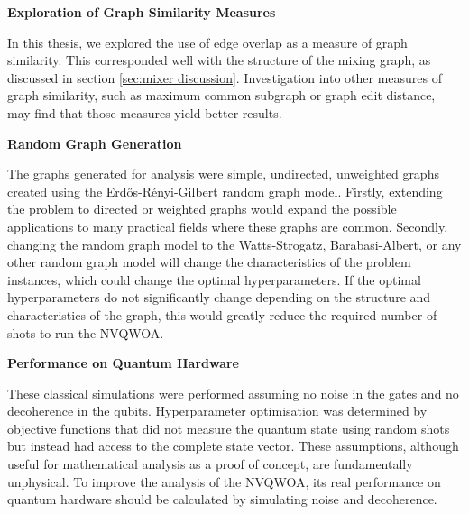 \textbf{Exploration of Graph Similarity Measures}

In this thesis, we explored the use of edge overlap as a measure of graph similarity. This corresponded well with the structure of the mixing graph, as discussed in section \ref{sec:mixer discussion}. Investigation into other measures of graph similarity, such as maximum common subgraph or graph edit distance, may find that those measures yield better results.

\textbf{Random Graph Generation}

The graphs generated for analysis were simple, undirected, unweighted graphs created using the Erdős-Rényi-Gilbert random graph model\cite{erdos_renyi,gilbert}. Firstly, extending the problem to directed or weighted graphs would expand the possible applications to many practical fields where these graphs are common.
Secondly, changing the random graph model to the Watts-Strogatz, Barabasi-Albert, or any other random graph model will change the characteristics of the problem instances, which could change the optimal hyperparameters. If the optimal hyperparameters do not significantly change depending on the structure and characteristics of the graph, this would greatly reduce the required number of shots to run the NVQWOA.

\textbf{Performance on Quantum Hardware}

These classical simulations were performed assuming no noise in the gates and no decoherence in the qubits. Hyperparameter optimisation was determined by objective functions that did not measure the quantum state using random shots but instead had access to the complete state vector. These assumptions, although useful for mathematical analysis as a proof of concept, are fundamentally unphysical. To improve the analysis of the NVQWOA, its real performance on quantum hardware should be calculated by simulating noise and decoherence.